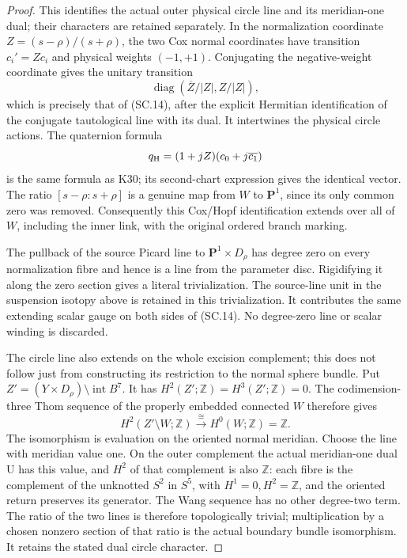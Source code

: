 \begin{proof}
This identifies the actual outer physical circle line and its meridian-one dual; their characters are retained separately. In the normalization coordinate
\(Z=(s-\rho)/(s+\rho)\), the two Cox normal coordinates have transition
\(c_i'=Zc_i\) and physical weights \((-1,+1)\). Conjugating the
negative-weight coordinate gives the unitary transition
\[
       \operatorname{diag}(\overline Z/|Z|,Z/|Z|),
\]
which is precisely that of (SC.14), after the explicit Hermitian
identification of the conjugate tautological line with its dual. It
intertwines the physical circle actions. The quaternion formula
\[
 q_{\rm H}=(1+jZ)(c_0+j\overline{c_1})
\]
is the same formula as K30; its second-chart expression gives the
identical vector. The ratio \([s-\rho:s+\rho]\) is a genuine map from
\(W\) to \(\mathbf P^1\), since its only common zero was removed.
Consequently this Cox/Hopf identification extends over all of \(W\),
including the inner link, with the original ordered branch marking.

The pullback of the source Picard line to
\(\mathbf P^1\times D_\rho\) has degree zero on every normalization
fibre and hence is a line from the parameter disc. Rigidifying it along
the zero section gives a literal trivialization. The source-line unit
in the suspension isotopy above is retained in this trivialization.
It contributes the same extending scalar gauge on both sides of
(SC.14). No degree-zero line or scalar winding is discarded.

The circle line also extends on the whole excision complement; this
does not follow just from constructing its restriction to the normal
sphere bundle. Put \(Z'= (Y\times D_\rho)\setminus\operatorname{int}B^7\).
It has \(H^2(Z';\mathbb Z)=H^3(Z';\mathbb Z)=0\). The codimension-three
Thom sequence of the properly embedded connected \(W\) therefore gives
\[
 H^2(Z'\setminus W;\mathbb Z)\xrightarrow{\ \cong\ }
             H^0(W;\mathbb Z)=\mathbb Z.             \tag{SC.15a}
\]
The isomorphism is evaluation on the oriented normal meridian. Choose
the line with meridian value one. On the outer complement the actual
meridian-one dual U has this value, and \(H^2\) of that complement is also
\(\mathbb Z\): each fibre is the complement of the unknotted \(S^2\)
in \(S^5\), with \(H^1=0,H^2=\mathbb Z\), and the oriented return
preserves its generator. The Wang sequence has no other degree-two
term. The ratio of the two lines is therefore topologically trivial;
multiplication by a chosen nonzero section of that ratio is the actual
boundary bundle isomorphism. It retains the stated dual circle character.


\end{proof}
